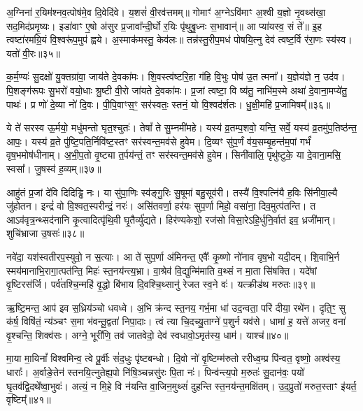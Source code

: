 {\anuvakamend[{प॒रि॒वा॒पात्प्र॒जां मयि॑ दुह्रते॒ चतु॑र्दश च॥10॥}]}

अ॒ग्निना॑ र॒यिम॑श्नव॒त्पोष॑मे॒व दि॒वेदि॑वे। य॒शसं॑ वी॒रव॑त्तमम्॥ गोमाꣳ॑ अ॒ग्ने\-ऽवि॑माꣳ अ॒श्वी य॒ज्ञो नृ॒वथ्स॑खा॒ सद॒मिद॑प्रमृ॒ष्यः। इडा॑वाꣳ ए॒षो अ॑सुर प्र॒जावा᳚न्दी॒र्घो र॒यिः पृ॑थुबु॒ध्नः स॒भावान्॑॥ आ प्या॑यस्व॒ सं ते᳚॥ इ॒ह त्वष्टा॑रमग्रि॒यं वि॒श्वरू॑प॒मुप॑ ह्वये। अ॒स्माक॑मस्तु॒ केव॑लः॥ तन्न॑स्तु॒रीप॒मध॑ पोषयि॒त्नु देव॑ त्वष्ट॒र्वि र॑रा॒णः स्य॑स्व। यतो॑ वी॒रः॥३५॥

क॒र्म॒ण्यः॑ सु॒दक्षो॑ यु॒क्तग्रा॑वा॒ जाय॑ते दे॒वका॑मः। शि॒वस्त्व॑ष्टरि॒हा ग॑हि वि॒भुः पोष॑ उ॒त त्मना᳚। य॒ज्ञेय॑ज्ञे न॒ उद॑व। पि॒शङ्ग॑रूपः सु॒भरो॑ वयो॒धाः श्रु॒ष्टी वी॒रो जा॑यते दे॒वका॑मः। प्र॒जां त्वष्टा॒ वि ष्य॑तु॒ नाभि॑म॒स्मे अथा॑ दे॒वाना॒मप्ये॑तु॒ पाथः॑। प्र णो॑ दे॒व्या नो॑ दि॒वः। पी॒पि॒वाꣳस॒ꣳ॒ सर॑स्वतः॒ स्तनं॒ यो वि॒श्वद॑र्शतः। धु॒क्षी॒महि॑ प्र॒जामिषम्᳚॥३६॥

ये ते॑ सरस्व ऊ॒र्मयो॒ मधु॑मन्तो घृत॒श्चुतः॑। तेषां᳚ ते सु॒म्नमी॑महे। यस्य॑ व्र॒तम्प॒शवो॒ यन्ति॒ सर्वे॒ यस्य॑ व्र॒तमु॑प॒तिष्ठ॑न्त॒ आपः॒। यस्य॑ व्र॒ते पु॑ष्टि॒पति॒र्निवि॑ष्ट॒स्तꣳ सर॑स्वन्त॒मव॑से हुवेम। दि॒व्यꣳ सु॑प॒र्णं व॑य॒सम्बृ॒हन्त॑म॒पां गर्भं॑ वृष॒भमोष॑धीनाम्। अ॒भी॒प॒तो वृ॒ष्ट्या त॒र्पय॑न्तं॒ तꣳ सर॑स्वन्त॒मव॑से हुवेम। सिनी॑वालि॒ पृथु॑ष्टुके॒ या दे॒वाना॒मसि॒ स्वसा᳚। जु॒षस्व॑ ह॒व्यम्॥३७॥

आहु॑तं प्र॒जां दे॑वि दिदिड्ढि नः। या सु॑पा॒णिः स्व॑ङ्गु॒रिः सु॒षूमा॑ बहु॒सूव॑री। तस्यै॑ वि॒श्पत्नि॑यै ह॒विः सि॑नीवा॒ल्यै जु॑होतन। इन्द्रं॑ वो वि॒श्वत॒स्परीन्द्रं॒ नरः॑। असि॑तवर्णा॒ हर॑यः सुप॒र्णा मिहो॒ वसा॑ना॒ दिव॒मुत्प॑तन्ति। त आ\-ऽव॑वृत्र॒न्थ्सद॑नानि कृ॒त्वादित्पृ॑थि॒वी घृ॒तैर्व्यु॑द्यते। हिर॑ण्यकेशो॒ रज॑सो विसा॒रे\-ऽहि॒र्धुनि॒र्वात॑ इव॒ ध्रजी॑मान्। शुचि॑भ्राजा उ॒षसः॑॥३८॥

नवे॑दा॒ यश॑स्वतीरप॒स्युवो॒ न स॒त्याः। आ ते॑ सुप॒र्णा अ॑मिनन्त॒ एवैः᳚ कृ॒ष्णो नो॑नाव वृष॒भो यदी॒दम्। शि॒वाभि॒र्न स्मय॑मानाभि॒रागा॒त्पत॑न्ति॒ मिहः॑ स्त॒नय॑न्त्य॒भ्रा। वा॒श्रेव॑ वि॒द्युन्मि॑माति व॒थ्सं न मा॒ता सि॑षक्ति। यदे॑षां वृ॒ष्टिरस॑र्जि। पर्व॑तश्चि॒न्महि॑ वृ॒द्धो बि॑भाय दि॒वश्चि॒थ्सानु॑ रेजत स्व॒ने वः॑। यत्क्रीड॑थ मरुतः॥३९॥

ऋ॒ष्टि॒मन्त॒ आप॑ इव स॒ध्रिय॑ञ्चो धवध्वे। अ॒भि क्र॑न्द स्त॒नय॒ गर्भ॒मा धा॑ उद॒न्वता॒ परि॑ दीया॒ रथे॑न। दृति॒ꣳ॒ सु क॑र्\mbox{}ष॒ विषि॑तं॒ न्य॑ञ्चꣳ स॒मा भ॑वन्तू॒द्वता॑ निपा॒दाः। त्वं त्या चि॒दच्यु॒ताग्ने॑ प॒शुर्न यव॑से। धामा॑ ह॒ यत्ते॑ अजर॒ वना॑ वृ॒श्चन्ति॒ शिक्व॑सः। अग्ने॒ भूरी॑णि॒ तव॑ जातवेदो॒ देव॑ स्वधावो॒\-ऽमृत॑स्य॒ धाम॑। याश्च॑॥४०॥

मा॒या मा॒यिनां᳚ विश्वमिन्व॒ त्वे पू॒र्वीः सं॑द॒धुः पृ॑ष्टबन्धो। दि॒वो नो॑ वृ॒ष्टिम्म॑रुतो ररीध्व॒म्प्र पि॑न्वत॒ वृष्णो॒ अश्व॑स्य॒ धाराः᳚। अ॒र्वाङे॒तेन॑ स्तनयि॒त्नुतेह्य॒पो नि॑षि॒ञ्चन्नसु॑रः पि॒ता नः॑। पिन्व॑न्त्य॒पो म॒रुतः॑ सु॒दान॑वः॒ पयो॑ घृ॒तव॑द्वि॒दथे᳚ष्वा॒भुवः॑। अत्यं॒ न मि॒हे वि न॑यन्ति वा॒जिन॒मुथ्सं॑ दुहन्ति स्त॒नय॑न्त॒मक्षि॑तम्। उ॒द॒प्रुतो॑ मरुत॒स्ताꣳ इ॑यर्त॒ वृष्टिम्᳚॥४१॥

